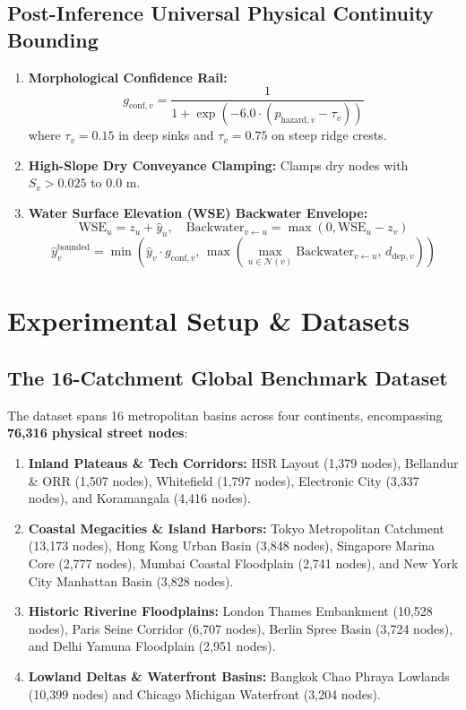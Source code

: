 \documentclass[conference]{IEEEtran}
\begin{document}
\subsection{Post-Inference Universal Physical Continuity Bounding}
\begin{enumerate}
    \item \textbf{Morphological Confidence Rail:}
    \begin{equation}
    g_{\text{conf}, v} = \frac{1}{1 + \exp\left(-6.0 \cdot (p_{\text{hazard}, v} - \tau_v)\right)}
    \end{equation}
    where $\tau_v = 0.15$ in deep sinks and $\tau_v = 0.75$ on steep ridge crests.
    \item \textbf{High-Slope Dry Conveyance Clamping:} Clamps dry nodes with $S_v > 0.025$ to $0.0\text{ m}$.
    \item \textbf{Water Surface Elevation (WSE) Backwater Envelope:}
    \begin{equation}
    \text{WSE}_u = z_u + \hat{y}_u, \quad \text{Backwater}_{v \leftarrow u} = \max(0, \text{WSE}_u - z_v)
    \end{equation}
    \begin{equation}
    \hat{y}_v^{\text{bounded}} = \min\left(\hat{y}_v \cdot g_{\text{conf}, v}, \, \max\left(\max_{u \in \mathcal{N}(v)} \text{Backwater}_{v \leftarrow u}, \, d_{\text{dep}, v}\right)\right)
    \end{equation}
\end{enumerate}

\section{Experimental Setup \& Datasets}

\subsection{The 16-Catchment Global Benchmark Dataset}
The dataset spans 16 metropolitan basins across four continents, encompassing \textbf{76,316 physical street nodes}:
\begin{enumerate}
    \item \textbf{Inland Plateaus \& Tech Corridors:} HSR Layout (1,379 nodes), Bellandur \& ORR (1,507 nodes), Whitefield (1,797 nodes), Electronic City (3,337 nodes), and Koramangala (4,416 nodes).
    \item \textbf{Coastal Megacities \& Island Harbors:} Tokyo Metropolitan Catchment (13,173 nodes), Hong Kong Urban Basin (3,848 nodes), Singapore Marina Core (2,777 nodes), Mumbai Coastal Floodplain (2,741 nodes), and New York City Manhattan Basin (3,828 nodes).
    \item \textbf{Historic Riverine Floodplains:} London Thames Embankment (10,528 nodes), Paris Seine Corridor (6,707 nodes), Berlin Spree Basin (3,724 nodes), and Delhi Yamuna Floodplain (2,951 nodes).
    \item \textbf{Lowland Deltas \& Waterfront Basins:} Bangkok Chao Phraya Lowlands (10,399 nodes) and Chicago Michigan Waterfront (3,204 nodes).
\end{enumerate}
\end{document}
